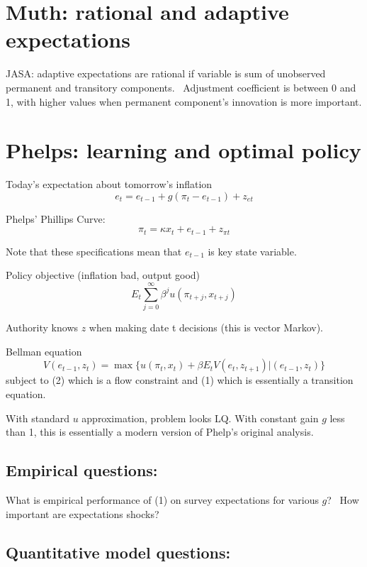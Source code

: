 \documentclass{article}%
\begin{document}
\section{Muth: rational and adaptive expectations}

JASA: adaptive expectations are rational if variable is sum of unobserved
permanent and transitory components. \ Adjustment coefficient is between 0 and
1, with higher values when permanent component's innovation is more important.

\section{Phelps: learning and optimal policy}

Today's expectation about tomorrow's inflation%
\[
e_{t}=e_{t-1}+g(\pi_{t}-e_{t-1})+z_{et}%
\]


Phelps' Phillips Curve:
\[
\pi_{t}=\kappa x_{t}+e_{t-1}+z_{\pi t}%
\]


Note that these specifications mean that $e_{t-1}$ is key state
variable.\bigskip

Policy objective (inflation bad, output good)%
\[
E_{t}\sum_{j=0}^{\infty}\beta^{j}u(\pi_{t+j},x_{t+j})
\]


Authority knows $z$ when making date t decisions (this is vector Markov).

\bigskip

Bellman equation
\[
V(e_{t-1},z_{t})=\max\{u(\pi_{t},x_{t})+\beta E_{t}V(e_{t},z_{t+1}%
)|(e_{t-1},z_{t})\}
\]
subject to (2) which is a flow constraint and (1) which is essentially a
transition equation. 

\bigskip

With standard $u$ approximation, problem looks LQ. With constant gain $g$ less
than 1, this is essentially a modern version of Phelp's original analysis. 



\subsection{Empirical questions: }

What is empirical performance of (1) on survey expectations for various $g$?
\ How important are expectations shocks?\bigskip

\subsection{Quantitative model questions:}
\end{document}
